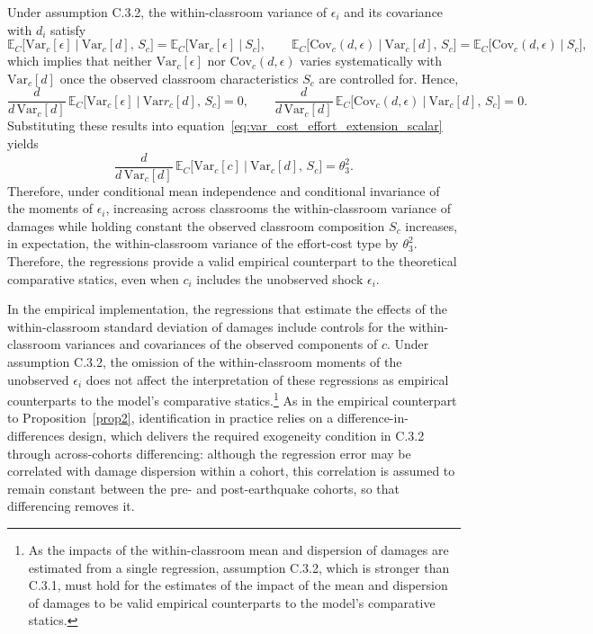 \noindent Under assumption C.3.2, the within-classroom variance of $\epsilon_i$ and its covariance with $d_i$ satisfy
\[
\mathbb{E}_C\!\big[\mathrm{Var}_c[\epsilon]\ \big|\ \mathrm{Var}_c[d],\,S_c\big]
= \mathbb{E}_C\!\big[\mathrm{Var}_c[\epsilon]\ \big|\ S_c\big],
\qquad
\mathbb{E}_C\!\big[\mathrm{Cov}_c(d,\epsilon)\ \big|\ \mathrm{Var}_c[d],\,S_c\big]
= \mathbb{E}_C\!\big[\mathrm{Cov}_c(d,\epsilon)\ \big|\ S_c\big],
\]
which implies that neither $\mathrm{Var}_c[\epsilon]$ nor $\mathrm{Cov}_c(d,\epsilon)$ varies systematically with $\mathrm{Var}_c[d]$ once the observed classroom characteristics $S_c$ are controlled for. Hence,
\[
\frac{d}{d\,\mathrm{Var}_c[d]}\,
\mathbb{E}_C\!\big[\mathrm{Var}_c[\epsilon]\ \big|\ \mathrm{Var}r_c[d],\,S_c\big] = 0,
\qquad
\frac{d}{d\,\mathrm{Var}_c[d]}\,
\mathbb{E}_C\!\big[\mathrm{Cov}_c(d,\epsilon)\ \big|\ \mathrm{Var}_c[d],\,S_c\big] = 0.
\]
Substituting these results into equation~\eqref{eq:var_cost_effort_extension_scalar} yields
\[
\frac{d}{d\,\mathrm{Var}_c[d]}\,
\mathbb{E}_C\!\big[\mathrm{Var}_c[c]\ \big|\ \mathrm{Var}_c[d],\,S_c\big]
= \theta_3^2.
\]
Therefore, under conditional mean independence and conditional invariance of the moments of $\epsilon_i$, increasing across classrooms the within-classroom variance of damages while holding constant the observed classroom composition $S_c$ increases, in expectation, the within-classroom variance of the effort-cost type by $\theta_3^2$. Therefore, the regressions provide a valid empirical counterpart to the theoretical comparative statics, even when $c_i$ includes the unobserved shock $\epsilon_i$. \par 




In the empirical implementation, the regressions that estimate the effects of the within-classroom standard deviation of damages include controls for the within-classroom variances and covariances of the observed components of $c$.  Under assumption C.3.2, the omission of the within-classroom moments of the unobserved $\epsilon_i$ does not affect the interpretation of these regressions as empirical counterparts to the model’s comparative statics.\footnote{As the impacts of the within-classroom mean and dispersion of damages are estimated from a single regression, assumption C.3.2, which is stronger than C.3.1, must hold for the estimates of the impact of the mean and dispersion of damages to be valid empirical counterparts to the model's comparative statics.} As in the empirical counterpart to Proposition~\ref{prop2}, identification in practice relies on a difference-in-differences design, which delivers the required exogeneity condition in C.3.2 through across-cohorts differencing: although the regression error may be correlated with damage dispersion within a cohort, this correlation is assumed to remain constant between the pre- and post-earthquake cohorts, so that differencing removes it.\\ 



